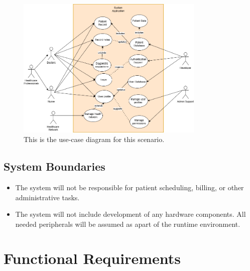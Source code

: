 \documentclass[12pt]{article}
\begin{document}
\begin{figure}[H]
  \includegraphics[width=0.8\textwidth]{use-case.drawio.png}
  \caption{This is the use-case diagram for this scenario.}
  \label{fig:Use-Case Diagram}
\end{figure}

\subsection{System Boundaries}
\begin{itemize}
  \item The system will not be responsible for patient scheduling, billing, or other administrative tasks.
  \item The system will not include development of any hardware components. All needed peripherals will be assumed as apart of the runtime environment.
\end{itemize}

\section{Functional Requirements}
\end{document}
